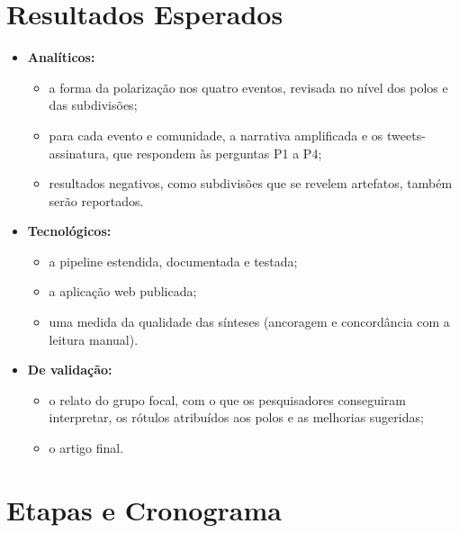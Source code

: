\documentclass[12pt,a4paper,oneside]{article}
\begin{document}
\section{Resultados Esperados}

\begin{itemize}
\item \textbf{Analíticos:}
\begin{itemize}
  \item a forma da polarização nos quatro eventos, revisada no nível dos polos e das subdivisões;
  \item para cada evento e comunidade, a narrativa amplificada e os tweets-assinatura, que respondem às perguntas P1 a P4;
  \item resultados negativos, como subdivisões que se revelem artefatos, também serão reportados.
\end{itemize}
\item \textbf{Tecnológicos:}
\begin{itemize}
  \item a pipeline estendida, documentada e testada;
  \item a aplicação web publicada;
  \item uma medida da qualidade das sínteses (ancoragem e concordância com a leitura manual).
\end{itemize}
\item \textbf{De validação:}
\begin{itemize}
  \item o relato do grupo focal, com o que os pesquisadores conseguiram interpretar, os rótulos atribuídos aos polos e as melhorias sugeridas;
  \item o artigo final.
\end{itemize}
\end{itemize}


\section{Etapas e Cronograma}
\end{document}
